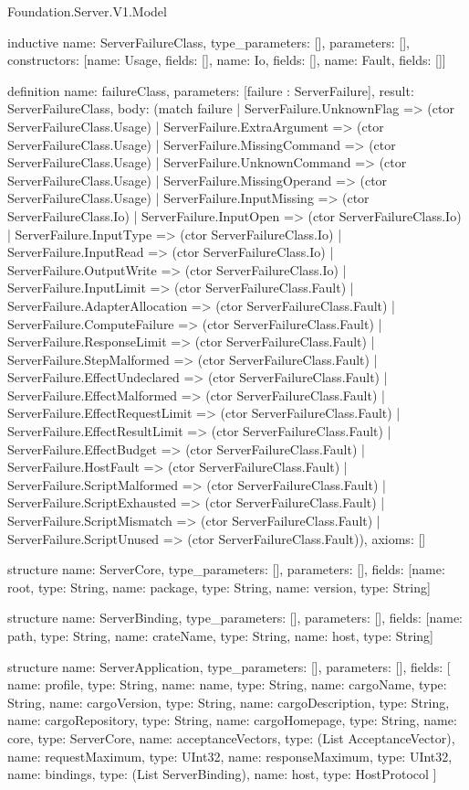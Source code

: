 \begin{lexlean}{Foundation.Server.V1.Model}
\begin{semanticmodule}
inductive{
  name: ServerFailureClass,
  type_parameters: [],
  parameters: [],
  constructors: [{name: Usage, fields: []}, {name: Io, fields: []}, {name: Fault, fields: []}]
}

definition{
  name: failureClass,
  parameters: [failure : ServerFailure],
  result: ServerFailureClass,
  body: (match failure
    | ServerFailure.UnknownFlag => (ctor ServerFailureClass.Usage)
    | ServerFailure.ExtraArgument => (ctor ServerFailureClass.Usage)
    | ServerFailure.MissingCommand => (ctor ServerFailureClass.Usage)
    | ServerFailure.UnknownCommand => (ctor ServerFailureClass.Usage)
    | ServerFailure.MissingOperand => (ctor ServerFailureClass.Usage)
    | ServerFailure.InputMissing => (ctor ServerFailureClass.Io)
    | ServerFailure.InputOpen => (ctor ServerFailureClass.Io)
    | ServerFailure.InputType => (ctor ServerFailureClass.Io)
    | ServerFailure.InputRead => (ctor ServerFailureClass.Io)
    | ServerFailure.OutputWrite => (ctor ServerFailureClass.Io)
    | ServerFailure.InputLimit => (ctor ServerFailureClass.Fault)
    | ServerFailure.AdapterAllocation => (ctor ServerFailureClass.Fault)
    | ServerFailure.ComputeFailure => (ctor ServerFailureClass.Fault)
    | ServerFailure.ResponseLimit => (ctor ServerFailureClass.Fault)
    | ServerFailure.StepMalformed => (ctor ServerFailureClass.Fault)
    | ServerFailure.EffectUndeclared => (ctor ServerFailureClass.Fault)
    | ServerFailure.EffectMalformed => (ctor ServerFailureClass.Fault)
    | ServerFailure.EffectRequestLimit => (ctor ServerFailureClass.Fault)
    | ServerFailure.EffectResultLimit => (ctor ServerFailureClass.Fault)
    | ServerFailure.EffectBudget => (ctor ServerFailureClass.Fault)
    | ServerFailure.HostFault => (ctor ServerFailureClass.Fault)
    | ServerFailure.ScriptMalformed => (ctor ServerFailureClass.Fault)
    | ServerFailure.ScriptExhausted => (ctor ServerFailureClass.Fault)
    | ServerFailure.ScriptMismatch => (ctor ServerFailureClass.Fault)
    | ServerFailure.ScriptUnused => (ctor ServerFailureClass.Fault)),
  axioms: []
}

structure{
  name: ServerCore,
  type_parameters: [],
  parameters: [],
  fields: [{name: root, type: String}, {name: package, type: String}, {name: version, type: String}]
}

structure{
  name: ServerBinding,
  type_parameters: [],
  parameters: [],
  fields: [{name: path, type: String}, {name: crateName, type: String}, {name: host, type: String}]
}

structure{
  name: ServerApplication,
  type_parameters: [],
  parameters: [],
  fields: [
    {name: profile, type: String},
    {name: name, type: String},
    {name: cargoName, type: String},
    {name: cargoVersion, type: String},
    {name: cargoDescription, type: String},
    {name: cargoRepository, type: String},
    {name: cargoHomepage, type: String},
    {name: core, type: ServerCore},
    {name: acceptanceVectors, type: (List AcceptanceVector)},
    {name: requestMaximum, type: UInt32},
    {name: responseMaximum, type: UInt32},
    {name: bindings, type: (List ServerBinding)},
    {name: host, type: HostProtocol}
  ]
}


\end{semanticmodule}
\end{lexlean}
